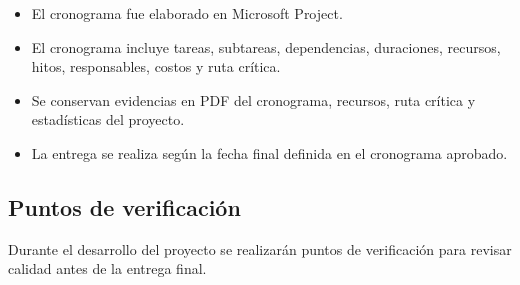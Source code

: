 \documentclass[11pt,spanish]{article}
\begin{document}
\begin{itemize}
    \item El cronograma fue elaborado en Microsoft Project.
    \item El cronograma incluye tareas, subtareas, dependencias, duraciones, recursos, hitos, responsables, costos y ruta crítica.
    \item Se conservan evidencias en PDF del cronograma, recursos, ruta crítica y estadísticas del proyecto.
    \item La entrega se realiza según la fecha final definida en el cronograma aprobado.
\end{itemize}

\subsection{Puntos de verificación}

Durante el desarrollo del proyecto se realizarán puntos de verificación para revisar calidad antes de la entrega final.
\end{document}
